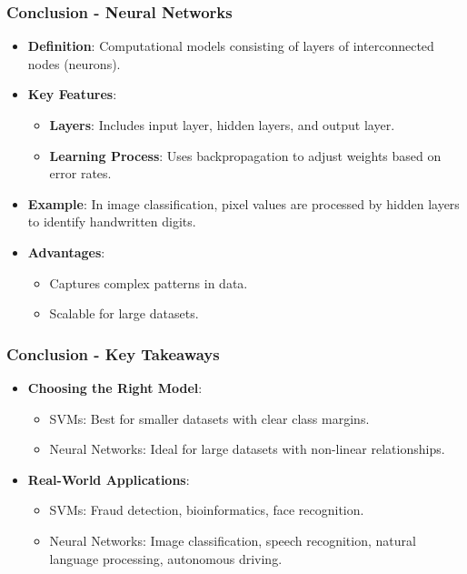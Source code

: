 \documentclass[aspectratio=169]{beamer}
\begin{document}
\begin{frame}[fragile]
    \frametitle{Conclusion - Neural Networks}
    \begin{itemize}
        \item \textbf{Definition}: Computational models consisting of layers of interconnected nodes (neurons).
        \item \textbf{Key Features}:
            \begin{itemize}
                \item \textbf{Layers}: Includes input layer, hidden layers, and output layer.
                \item \textbf{Learning Process}: Uses backpropagation to adjust weights based on error rates.
            \end{itemize}
        \item \textbf{Example}: In image classification, pixel values are processed by hidden layers to identify handwritten digits.
        \item \textbf{Advantages}:
            \begin{itemize}
                \item Captures complex patterns in data.
                \item Scalable for large datasets.
            \end{itemize}
    \end{itemize}
\end{frame}

\begin{frame}[fragile]
    \frametitle{Conclusion - Key Takeaways}
    \begin{itemize}
        \item \textbf{Choosing the Right Model}:
            \begin{itemize}
                \item SVMs: Best for smaller datasets with clear class margins.
                \item Neural Networks: Ideal for large datasets with non-linear relationships.
            \end{itemize}
        \item \textbf{Real-World Applications}:
            \begin{itemize}
                \item SVMs: Fraud detection, bioinformatics, face recognition.
                \item Neural Networks: Image classification, speech recognition, natural language processing, autonomous driving.
            \end{itemize}
    \end{itemize}
\end{frame}
\end{document}
